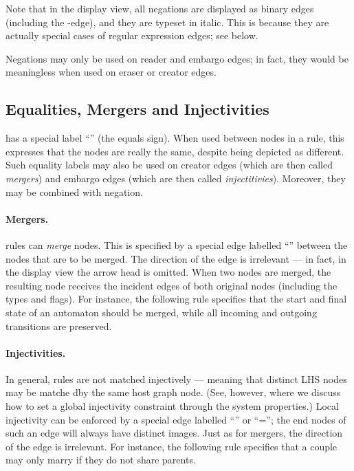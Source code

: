 Note that in the display view, all negations are displayed as binary edges
(including the -edge), and they are typeset in italic. This
is because they are actually special cases of regular expression edges; see
 below.


Negations may only be used on reader and embargo edges; in fact, they would be
meaningless when used on eraser or creator edges.

\subsection{Equalities, Mergers and Injectivities}

\GROOVE{} has a special label ``\lab{=}'' (the equals sign). When used
between nodes in a rule, this expresses that the nodes are really the same,
despite being depicted as different. Such equality labels may also be used on
creator edges (which are then called \emph{mergers}) and embargo edges (which
are then called \emph{injectitivies}). Moreover, they may be combined with
negation.

\paragraph{Mergers.}

\GROOVE{} rules can \emph{merge} nodes. This is specified by a special edge
labelled ``\newP\lab{=}'' between the nodes that are to be merged. The
direction of the edge is irrelevant --- in fact, in the display view the arrow
head is omitted. When two nodes are merged, the resulting
node receives the incident edges of both original nodes (including the
types and flags). For instance, the following rule specifies that the start
and final state of an automaton should be merged, while all incoming and
outgoing transitions are preserved.


\paragraph{Injectivities.}

In general, rules are not matched injectively --- meaning that distinct LHS
nodes may be matche dby the same host graph node. (See, however,
 where we discuss how to set a global injectivity
constraint through the system properties.) Local injectivity can be enforced by
a special edge labelled ``\lab{!=}'' or ``\notP\lab=''; the end nodes of
such an edge will always have distinct images. Just as for mergers, the
direction of the edge is irrelevant. For instance, the following rule specifies
that a couple may only marry if they do not share parents.

